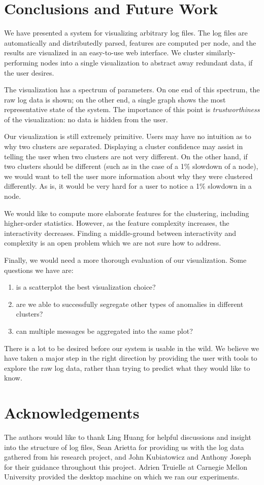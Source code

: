 \documentclass[conference]{style/acmsiggraph}
\begin{document}
\section{Conclusions and Future Work}

We have presented a system for visualizing arbitrary log files.
The log files are automatically and distributedly parsed, features are computed per node, and the results are visualized in an easy-to-use web interface.
We cluster similarly-performing nodes into a single visualization to abstract away redundant data, if the user desires.

The visualization has a spectrum of parameters.
On one end of this spectrum, the raw log data is shown; on the other end, a single graph shows the most representative state of the system.
The importance of this point is \emph{trustworthiness} of the visualization: no data is hidden from the user.

Our visualization is still extremely primitive.
Users may have no intuition as to why two clusters are separated.
Displaying a cluster confidence may assist in telling the user when two clusters are not very different.
On the other hand, if two clusters should be different (such as in the case of a 1\% slowdown of a node), we would want to tell the user more information about why they were clustered differently.
As is, it would be very hard for a user to notice a 1\% slowdown in a node.

We would like to compute more elaborate features for the clustering, including higher-order statistics.
However, as the feature complexity increases, the interactivity decreases.
Finding a middle-ground between interactivity and complexity is an open problem which we are not sure how to address.

Finally, we would need a more thorough evaluation of our visualization.
Some questions we have are:
\begin{enumerate}
    \item is a scatterplot the best visualization choice?
    \item are we able to successfully segregate other types of anomalies in different clusters?
    \item can multiple messages be aggregated into the same plot?
\end{enumerate}

There is a lot to be desired before our system is usable in the wild.
We believe we have taken a major step in the right direction by providing the user with tools to explore the raw log data, rather than trying to predict what they would like to know.

\section*{Acknowledgements}
The authors would like to thank Ling Huang for helpful discussions and insight into the structure of log files,
Sean Arietta for providing us with the log data gathered from his research project,
and John Kubiatowicz and Anthony Joseph for their guidance throughout this project.
Adrien Truielle at Carnegie Mellon University provided the desktop machine on which we ran our experiments.




\end{document}
